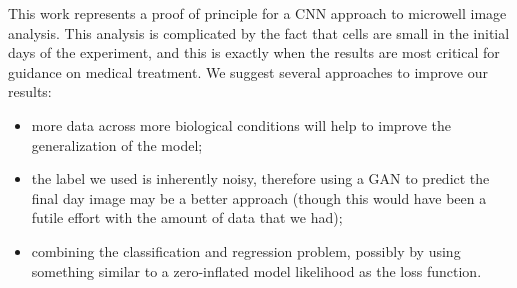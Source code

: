 \documentclass[10pt,twocolumn,letterpaper]{article}
\begin{document}
This work represents a proof of principle for a CNN approach to microwell image analysis.  This analysis is complicated by the fact that cells are small in the initial days of the experiment, and this is exactly when the results are most critical for guidance on medical treatment.  We suggest several approaches to improve our results:
\begin{itemize}
\item more data across more biological conditions will help to improve the generalization of the model;
\item the label we used is inherently noisy, therefore using a GAN to predict the final day image may be a better approach (though this would have been a futile effort with the amount of data that we had);
\item combining the classification and regression problem, possibly by using something similar to a zero-inflated model likelihood as the loss function.
\end{itemize}







{\small


}
\end{document}
